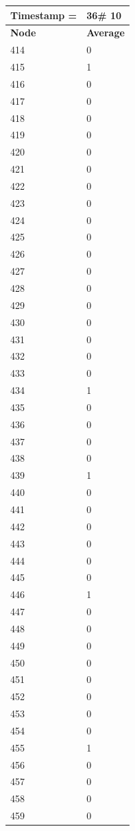 \begin{tabular}{|l||l|}
\hline
\textbf{Timestamp =} & \textbf{36}\# 10\\\hline
	\textbf{Node} & \textbf{Average} \\ \hline
\hline
	414 & 0 \\ \hline
	415 & 1 \\ \hline
	416 & 0 \\ \hline
	417 & 0 \\ \hline
	418 & 0 \\ \hline
	419 & 0 \\ \hline
	420 & 0 \\ \hline
	421 & 0 \\ \hline
	422 & 0 \\ \hline
	423 & 0 \\ \hline
	424 & 0 \\ \hline
	425 & 0 \\ \hline
	426 & 0 \\ \hline
	427 & 0 \\ \hline
	428 & 0 \\ \hline
	429 & 0 \\ \hline
	430 & 0 \\ \hline
	431 & 0 \\ \hline
	432 & 0 \\ \hline
	433 & 0 \\ \hline
	434 & 1 \\ \hline
	435 & 0 \\ \hline
	436 & 0 \\ \hline
	437 & 0 \\ \hline
	438 & 0 \\ \hline
	439 & 1 \\ \hline
	440 & 0 \\ \hline
	441 & 0 \\ \hline
	442 & 0 \\ \hline
	443 & 0 \\ \hline
	444 & 0 \\ \hline
	445 & 0 \\ \hline
	446 & 1 \\ \hline
	447 & 0 \\ \hline
	448 & 0 \\ \hline
	449 & 0 \\ \hline
	450 & 0 \\ \hline
	451 & 0 \\ \hline
	452 & 0 \\ \hline
	453 & 0 \\ \hline
	454 & 0 \\ \hline
	455 & 1 \\ \hline
	456 & 0 \\ \hline
	457 & 0 \\ \hline
	458 & 0 \\ \hline
	459 & 0 \\ \hline
\end{tabular}

